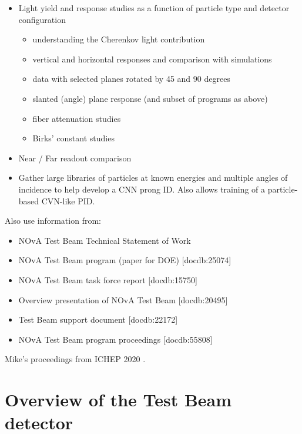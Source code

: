 \documentclass[12pt,a4paper]{article}
\begin{document}
\begin{itemize}
\item Light yield and response studies as a function of particle type and detector configuration
\begin{itemize}
\item understanding the Cherenkov light contribution
\item vertical and horizontal responses and comparison with simulations
\item data with selected planes rotated by 45 and 90 degrees
\item slanted (angle) plane response (and subset of programs as above)
\item fiber attenuation studies
\item Birks’ constant studies
\end{itemize}
\item Near / Far readout comparison
\item Gather large libraries of particles at known energies and multiple angles of incidence to help develop a CNN prong ID. Also allows training of a particle-based CVN-like PID.
\end{itemize}

Also use information from:
\begin{itemize}
\item NOvA Test Beam Technical Statement of Work
\item NOvA Test Beam program (paper for DOE) [docdb:25074]
\item NOvA Test Beam task force report [docdb:15750]
\item Overview presentation of NOvA Test Beam [docdb:20495]
\item Test Beam support document [docdb:22172]
\item NOvA Test Beam program proceedings [docdb:55808]
\end{itemize}

Mike's proceedings from ICHEP 2020 \cite{WallbankProceedingsICHEP2020}.

\section{Overview of the Test Beam detector}\label{secTBDetector}
\end{document}
